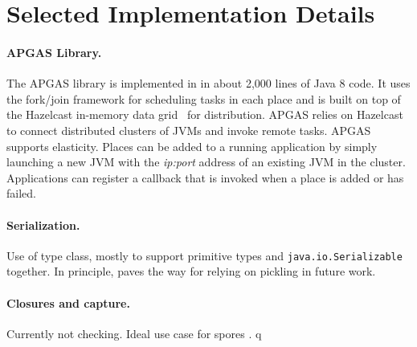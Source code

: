 \section{Selected Implementation Details}
\label{sec:serialization}

\paragraph{APGAS Library.}
The APGAS library is implemented in in about 2,000 lines of Java 8 code. It uses the fork/join framework for scheduling tasks in each place and is built on top of the Hazelcast in-memory data grid~\cite{hazelcast} for distribution. APGAS relies on Hazelcast to connect distributed clusters of JVMs and invoke remote tasks. 
APGAS supports elasticity. Places can be added to a running application by simply launching a new JVM with the \emph{ip:port} address of an existing JVM in the cluster. 
Applications can register a callback that is invoked when a place is added or has failed.


%


\paragraph{Serialization.}
Use of type class, mostly to support primitive types and
\lstinline{java.io.Serializable} together. In principle, paves the way for
relying on pickling \cite{MillerETAL13InstantPicklesGeneratingObjectorientedPicklerCombinators} in future work.

\paragraph{Closures and capture.} Currently not checking. Ideal use case for spores \cite{MillerHallerOdersky14SporesTypebasedFoundationClosuresAgeConcurrency}.
q